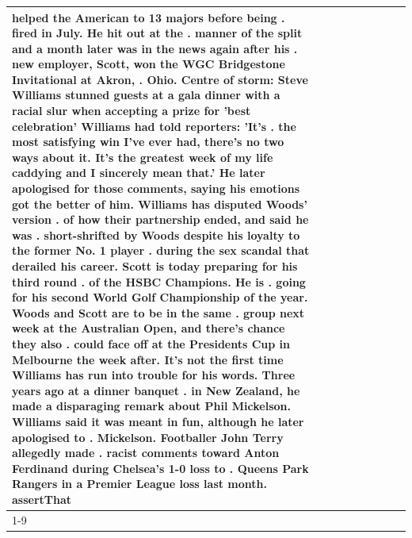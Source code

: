 \begin{table}[H]
\begin{tabular}{lllrlllll}
helped the American to 13 majors before being . fired in July. He hit out at the . manner of the split and a month later was in the news again after his . new employer, Scott, won the WGC Bridgestone Invitational at Akron, . Ohio. Centre of storm: Steve Williams stunned guests at a gala dinner with a racial slur when accepting a prize for 'best celebration' Williams had told reporters: 'It's . the most satisfying win I've ever had, there's no two ways about it. It's the greatest week of my life caddying and I sincerely mean that.' He later apologised for those comments, saying his emotions got the better of him. Williams has disputed Woods' version . of how their partnership ended, and said he was . short-shrifted by Woods despite his loyalty to the former No. 1 player . during the sex scandal that derailed his career. Scott is today preparing for his third round . of the HSBC Champions. He is . going for his second World Golf Championship of the year. Woods and Scott are to be in the same . group next week at the Australian Open, and there's chance they also . could face off at the Presidents Cup in Melbourne the week after. It's not the first time Williams has run into trouble for his words. Three years ago at a dinner banquet . in New Zealand, he made a disparaging remark about Phil Mickelson. Williams said it was meant in fun, although he later apologised to . Mickelson. Footballer John Terry allegedly made . racist comments toward Anton Ferdinand during Chelsea's 1-0 loss to . Queens Park Rangers in a Premier League loss last month. assertThat \\
\cline{1-9}

\end{tabular}
\end{table}
